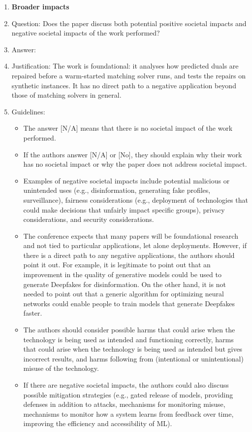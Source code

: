 \begin{enumerate}
\item {\bf Broader impacts}
    \item[] Question: Does the paper discuss both potential positive societal impacts and negative societal impacts of the work performed?
    \item[] Answer: \answerNA{}
    \item[] Justification: The work is foundational: it analyses how predicted duals are repaired before a warm-started matching solver runs, and tests the repairs on synthetic instances. It has no direct path to a negative application beyond those of matching solvers in general.
    \item[] Guidelines:
    \begin{itemize}
        \item The answer [N/A] means that there is no societal impact of the work performed.
        \item If the authors answer [N/A] or [No], they should explain why their work has no societal impact or why the paper does not address societal impact.
        \item Examples of negative societal impacts include potential malicious or unintended uses (e.g., disinformation, generating fake profiles, surveillance), fairness considerations (e.g., deployment of technologies that could make decisions that unfairly impact specific groups), privacy considerations, and security considerations.
        \item The conference expects that many papers will be foundational research and not tied to particular applications, let alone deployments. However, if there is a direct path to any negative applications, the authors should point it out. For example, it is legitimate to point out that an improvement in the quality of generative models could be used to generate Deepfakes for disinformation. On the other hand, it is not needed to point out that a generic algorithm for optimizing neural networks could enable people to train models that generate Deepfakes faster.
        \item The authors should consider possible harms that could arise when the technology is being used as intended and functioning correctly, harms that could arise when the technology is being used as intended but gives incorrect results, and harms following from (intentional or unintentional) misuse of the technology.
        \item If there are negative societal impacts, the authors could also discuss possible mitigation strategies (e.g., gated release of models, providing defenses in addition to attacks, mechanisms for monitoring misuse, mechanisms to monitor how a system learns from feedback over time, improving the efficiency and accessibility of ML).
    \end{itemize}


\end{enumerate}

